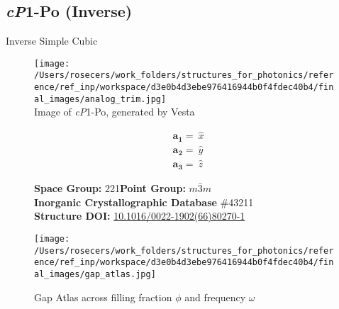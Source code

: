\subsection{\large{\textit{cP}1-Po (Inverse)}}\vspace{-0.1in}
Inverse Simple Cubic


\begin{figure}[H]
\begin{minipage}{0.34\textwidth}\centering
\texttt{[image: /Users/rosecers/work\_folders/structures\_for\_photonics/reference/ref\_inp/workspace/d3e0b4d3ebe976416944b0f4fdec40b4/final\_images/analog\_trim.jpg]}\\
\small{Image of \textit{cP}1-Po, generated by Vesta}
\end{minipage}\hfill
\begin{minipage}{0.65\textwidth}\raggedright
{\setlength{\mathindent}{0cm}
\begin{equation*}
\begin{split}&\boldsymbol{a_1} = \ \hat{x}\\[-8pt]
&\boldsymbol{a_2} = \ \hat{y}\\[-8pt]
&\boldsymbol{a_3} = \ \hat{z}
\end{split}
\end{equation*}}

\textbf{Space Group:}	221\hspace{0.5in}\textbf{Point Group:}	$m\bar{3}m$\\
\textbf{Inorganic Crystallographic Database} \#43211\\
\textbf{Structure DOI: }\url{10.1016/0022-1902(66)80270-1}

\end{minipage}\hfill
\end{figure}
\vspace{-0.25in}


\begin{figure}[H]
\begin{minipage}{0.9\textwidth}\centering
\texttt{[image: /Users/rosecers/work\_folders/structures\_for\_photonics/reference/ref\_inp/workspace/d3e0b4d3ebe976416944b0f4fdec40b4/final\_images/gap\_atlas.jpg]}
\\
\end{minipage}\hfill\caption{Gap Atlas across filling fraction $\phi$ and frequency $\omega$}
\end{figure}


